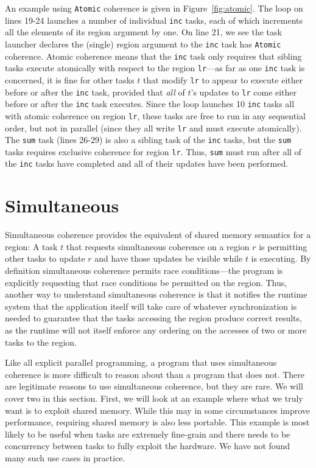 An example using {\tt Atomic} coherence is given in Figure~\ref{fig:atomic}.
The loop on lines 19-24 launches a number of individual {\tt inc} tasks,
each of which increments all the elements of its region argument by one.
On line 21, we see the task launcher declares the (single) region argument
to the {\tt inc} task has {\tt Atomic} coherence.  Atomic coherence means that
the {\tt inc} task only requires that sibling tasks execute atomically with
respect to the region {\tt lr}---as far as one {\tt inc} task is concerned,
it is fine for other tasks $t$ that modify {\tt lr} to appear to execute either before or
after the {\tt inc} task, provided that {\em all} of $t$'s updates
to {\tt lr} come either before or after the {\tt inc} task executes.
Since the loop launches 10 {\tt inc} tasks all with atomic coherence on region {\tt lr},
these tasks are free to run in any sequential order, but not in parallel (since
they all write {\tt lr} and must execute atomically).  The {\tt sum} task (lines 26-29)
is also a sibling task of the {\tt inc} tasks, but the {\tt sum} tasks requires
exclusive coherence for region {\tt lr}.  Thus, {\tt sum} must run after all of the {\tt inc} tasks have completed and all of their updates have been performed.

\section{Simultaneous}
\label{sec:simultaneous}

Simultaneous coherence provides the equivalent of shared memory semantics for a region: A task $t$ that requests simultaneous coherence on a region $r$ is permitting
other tasks to update $r$ and have those updates be visible while $t$ is executing.  By definition simultaneous coherence permits race conditions---the program is 
explicitly requesting that race conditions be permitted on the region. Thus, another way to understand simultaneous coherence is that it notifies the runtime system
that the application itself will take care of whatever synchronization is needed to guarantee that the tasks accessing the region
produce correct results, as the runtime will not itself enforce any ordering on the accesses of two or more tasks to the region.

Like all explicit parallel programming, a program that uses simultaneous coherence is more difficult to reason about than a program that does not.  There are legitimate reasons to use simultaneous
coherence, but they are rare.  We will cover two in this section.  First, we will look at an example where what we truly want is to exploit shared memory.  While this may
in some circumstances improve performance, requiring shared memory is also less portable.  This example is most likely to be useful when tasks are extremely fine-grain
and there needs to be concurrency between tasks to fully exploit the hardware. We have not found many such use cases in practice.

